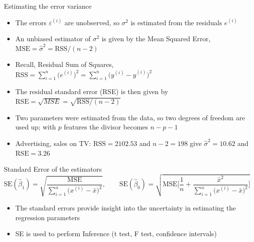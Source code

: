 \begin{frame}{Estimating the error variance}
    \begin{itemize}
        \item The errors $\varepsilon^{(i)}$ are unobserved, so $\sigma^2$ is estimated from the residuals $e^{(i)}$
        \item An unbiased estimator of \(\sigma^2\) is given by the Mean Squared Error, $\mathrm{MSE} = \boxed{\hat\sigma^2 = \mathrm{RSS}/(n-2)}$
        \item Recall, Residual Sum of Squares, \(\mathrm{RSS} = \sum_{i=1}^{n} \big(e^{(i)}\big)^2 = \sum_{i=1}^{n} \big(y^{(i)} - \hat{y}^{(i)}\big)^2\)
        \item The residual standard error (RSE) is then given by \(\mathrm{RSE} = \sqrt{MSE} = \sqrt{\mathrm{RSS}/(n-2)}\)
        \item Two parameters were estimated from the data, so two degrees of freedom are used up; with $p$ features the divisor becomes $n-p-1$
        \item Advertising, sales on TV: $\mathrm{RSS} = 2102.53$ and $n - 2 = 198$ give $\hat\sigma^2 = 10.62$ and $\mathrm{RSE} = 3.26$
    \end{itemize}
\end{frame}


\begin{frame}{Standard Error of the estimators}
    \[
        \mathrm{SE}(\hat\beta_1) = \sqrt{\frac{\mathrm{MSE}}{\sum_{i=1}^{n} \big(x^{(i)} - \bar{x}\big)^2}}, \qquad \mathrm{SE}(\hat\beta_0) = \sqrt{\mathrm{MSE} \bigg[\frac{1}{n} + \frac{\bar{x}^2}{\sum_{i=1}^{n} \big(x^{(i)} - \bar{x}\big)^2}\bigg]}
    \]

    \begin{itemize}
        \item The standard errors provide insight into the uncertainty in estimating the regression parameters
        \item SE is used to perform Inference (t test, F test, confidence intervals)
    \end{itemize}
\end{frame}


